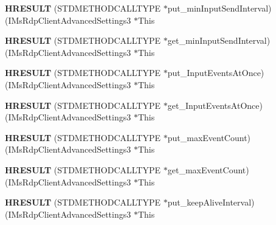 \begin{DoxyCompactItemize}
{\bfseries H\+R\+E\+S\+U\+LT} (S\+T\+D\+M\+E\+T\+H\+O\+D\+C\+A\+L\+L\+T\+Y\+PE $\ast$put\+\_\+min\+Input\+Send\+Interval)(I\+Ms\+Rdp\+Client\+Advanced\+Settings3 $\ast$This
\item 
\mbox{\label{struct_i_ms_rdp_client_advanced_settings3_vtbl_ada1641e3de7b3183b58e3f396a7af63c}} 
{\bfseries H\+R\+E\+S\+U\+LT} (S\+T\+D\+M\+E\+T\+H\+O\+D\+C\+A\+L\+L\+T\+Y\+PE $\ast$get\+\_\+min\+Input\+Send\+Interval)(I\+Ms\+Rdp\+Client\+Advanced\+Settings3 $\ast$This
\item 
\mbox{\label{struct_i_ms_rdp_client_advanced_settings3_vtbl_a2d4c4e8cbdba336b422bdb3e0087fce4}} 
{\bfseries H\+R\+E\+S\+U\+LT} (S\+T\+D\+M\+E\+T\+H\+O\+D\+C\+A\+L\+L\+T\+Y\+PE $\ast$put\+\_\+\+Input\+Events\+At\+Once)(I\+Ms\+Rdp\+Client\+Advanced\+Settings3 $\ast$This
\item 
\mbox{\label{struct_i_ms_rdp_client_advanced_settings3_vtbl_a0684fb4884ad692568e6c0114d8f006c}} 
{\bfseries H\+R\+E\+S\+U\+LT} (S\+T\+D\+M\+E\+T\+H\+O\+D\+C\+A\+L\+L\+T\+Y\+PE $\ast$get\+\_\+\+Input\+Events\+At\+Once)(I\+Ms\+Rdp\+Client\+Advanced\+Settings3 $\ast$This
\item 
\mbox{\label{struct_i_ms_rdp_client_advanced_settings3_vtbl_afa593f3fa4020f911058706b3273a61a}} 
{\bfseries H\+R\+E\+S\+U\+LT} (S\+T\+D\+M\+E\+T\+H\+O\+D\+C\+A\+L\+L\+T\+Y\+PE $\ast$put\+\_\+max\+Event\+Count)(I\+Ms\+Rdp\+Client\+Advanced\+Settings3 $\ast$This
\item 
\mbox{\label{struct_i_ms_rdp_client_advanced_settings3_vtbl_ad8d6f055ea90bcc8280af167a0eaac22}} 
{\bfseries H\+R\+E\+S\+U\+LT} (S\+T\+D\+M\+E\+T\+H\+O\+D\+C\+A\+L\+L\+T\+Y\+PE $\ast$get\+\_\+max\+Event\+Count)(I\+Ms\+Rdp\+Client\+Advanced\+Settings3 $\ast$This
\item 
\mbox{\label{struct_i_ms_rdp_client_advanced_settings3_vtbl_a25128a4f72cf31fb0c02a0b31561daf7}} 
{\bfseries H\+R\+E\+S\+U\+LT} (S\+T\+D\+M\+E\+T\+H\+O\+D\+C\+A\+L\+L\+T\+Y\+PE $\ast$put\+\_\+keep\+Alive\+Interval)(I\+Ms\+Rdp\+Client\+Advanced\+Settings3 $\ast$This

\end{DoxyCompactItemize}
